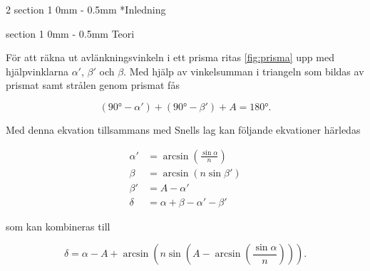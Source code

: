 \documentclass[a4paper]{article}
\makeatletter
\renewcommand{\section}{\@startsection
{section}%
{1}%
{0mm}%
{-\baselineskip}%
{0.5mm}%
{\normalfont\bfseries}} %
\makeatother
\begin{document}
\begin{multicols}{2}
  \section*{Inledning}

%

  \section{Teori}
  
  För att räkna ut avlänkningsvinkeln i ett prisma ritas \autoref{fig:prisma} upp med hjälpvinklarna $\alpha'$, $\beta'$ och $\beta$. Med hjälp av vinkelsumman i triangeln som bildas av prismat samt strålen genom prismat fås
  
  \begin{equation} \label{eq:triSum}
  	(90° - \alpha') + (90° - \beta') + A = 180°.
  \end{equation}
  
  Med denna ekvation tillsammans med Snells lag kan följande ekvationer härledas

  \begin{align} 
  \label{eq:alphaPrim}
  \alpha' &= \arcsin\left(\frac{\sin\alpha}{n}\right)\\
  \label{eq:beta}
  \beta &= \arcsin\left(n \sin\beta'\right)\\
  \label{eq:betaPrim}
  \beta' &= A-\alpha'\\
  \label{eq:delta}
  \delta &= \alpha+\beta-\alpha'-\beta'
  \end{align}
  
  som kan kombineras till

  \begin{equation} \label{eq:avlänkning}
  \delta = \alpha-A+\arcsin\left(n \sin\left(A-\arcsin\left(\frac{\sin\alpha}{n}\right)\right)\right).
  \end{equation}


\end{multicols}
\end{document}
